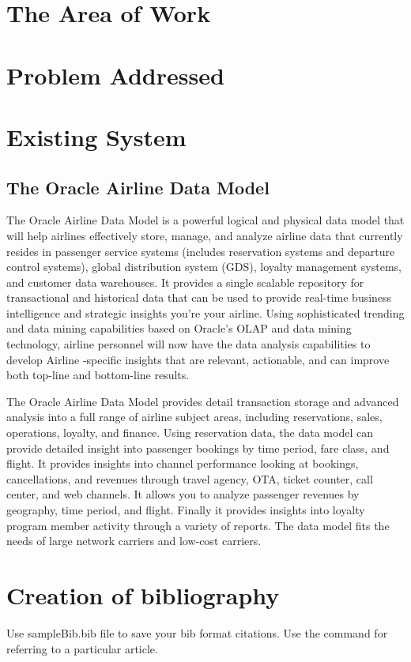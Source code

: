 \section{The Area of Work}
 
\blindtext


\section{Problem Addressed}



\section{Existing System}



\subsection{The  Oracle Airline Data Model}
The  Oracle  Airline Data Model is a powerful logical and physical data model that will help  airlines effectively store, manage, and analyze airline data that currently resides in passenger service systems (includes
reservation systems and departure control systems), global distribution system (GDS), loyalty management systems, and customer data warehouses.  It provides a single scalable repository for transactional and historical data 
that can be used to provide real-time business intelligence and strategic 
insights you’re  your airline. Using sophisticated trending and data mining capabilities based on Oracle’s  OLAP and data mining technology,  airline personnel will now have the data analysis  capabilities to develop Airline -specific insights that are relevant, actionable, and can improve both top-line and bottom-line results. 

The Oracle Airline Data Model provides detail transaction storage and advanced analysis into a full range of airline
subject areas, including reservations, sales, operations, loyalty, 
and finance.  Using reservation data, the data model can provide detailed insight into passenger bookings by time period, fare class, and flight.  It provides insights into channel performance looking at bookings, cancellations, and revenues through travel agency, OTA, ticket counter, call center, and web channels.  It allows you to analyze passenger 
revenues by geography, time period, and flight.  Finally it provides insights into loyalty program member activity through a variety of reports.  
The data model fits the needs of large network carriers and low-cost carriers. 

 
\section{Creation of bibliography}
Use sampleBib.bib file to save your bib format citations. Use the command \cite{saini2010alternative} for referring to a particular article. 





